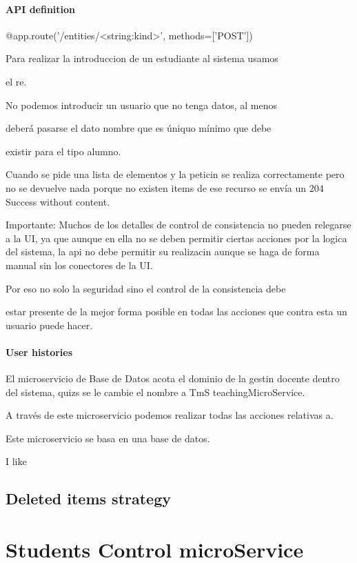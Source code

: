 \paragraph{API definition}

@app.route('/entities/<string:kind>', methods={[}'POST'{]})

Para realizar la introduccion de un estudiante al sistema usamos

el re.

No podemos introducir un usuario que no tenga datos, al menos

deberá pasarse el dato nombre que es úniquo mínimo que debe

existir para el tipo alumno.

Cuando se pide una lista de elementos y la peticin se realiza correctamente
pero no se devuelve nada porque no existen items de ese recurso se
envía un 204 Success without content.

Importante: Muchos de los detalles de control de consistencia no pueden
relegarse a la UI, ya que aunque en ella no se deben permitir ciertas
acciones por la logica del sistema, la api no debe permitir su realizacin
aunque se haga de forma manual sin los conectores de la UI.

Por eso no solo la seguridad sino el control de la consistencia debe

estar presente de la mejor forma posible en todas las acciones que
contra esta un usuario puede hacer.

\paragraph{User histories}

El microservicio de Base de Datos acota el dominio de la gestin docente
dentro del sistema, quizs se le cambie el nombre a TmS teachingMicroService.

A través de este microservicio podemos realizar todas las acciones
relativas a.

Este microservicio se basa en una base de datos.

I like

\subsection{Deleted items strategy}

\section{Students Control microService}

